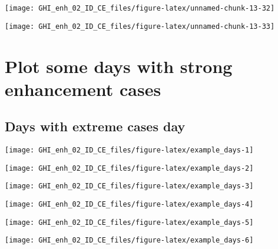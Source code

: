 \documentclass[
  10pt,
  a4paper,oneside]{article}
\begin{document}
\begin{center}\texttt{[image: GHI\_enh\_02\_ID\_CE\_files/figure-latex/unnamed-chunk-13-32]} \end{center}

\begin{center}\texttt{[image: GHI\_enh\_02\_ID\_CE\_files/figure-latex/unnamed-chunk-13-33]} \end{center}

\FloatBarrier

\hypertarget{plot-some-days-with-strong-enhancement-cases}{%
\section{Plot some days with strong enhancement cases}\label{plot-some-days-with-strong-enhancement-cases}}

\FloatBarrier

\hypertarget{days-with-extreme-cases-day}{%
\subsection{Days with extreme cases day}\label{days-with-extreme-cases-day}}

\begin{center}\texttt{[image: GHI\_enh\_02\_ID\_CE\_files/figure-latex/example\_days-1]} \end{center}

\begin{center}\texttt{[image: GHI\_enh\_02\_ID\_CE\_files/figure-latex/example\_days-2]} \end{center}

\begin{center}\texttt{[image: GHI\_enh\_02\_ID\_CE\_files/figure-latex/example\_days-3]} \end{center}

\begin{center}\texttt{[image: GHI\_enh\_02\_ID\_CE\_files/figure-latex/example\_days-4]} \end{center}

\begin{center}\texttt{[image: GHI\_enh\_02\_ID\_CE\_files/figure-latex/example\_days-5]} \end{center}

\begin{center}\texttt{[image: GHI\_enh\_02\_ID\_CE\_files/figure-latex/example\_days-6]} \end{center}
\end{document}
